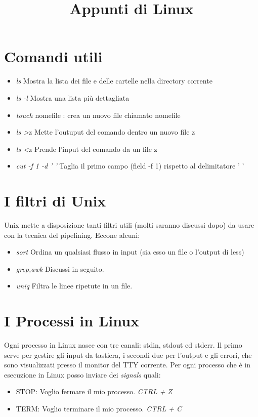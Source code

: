 \documentclass[a4paper,12pt]{article} %
\title{Appunti di Linux} %
\begin{document}
\maketitle %
\tableofcontents %

\section{Comandi utili}
\begin{itemize}
\item  \textit{ls} Mostra la lista dei file e delle cartelle nella directory corrente
\item  \textit{ls -l} Mostra una lista più dettagliata
\item  \textit{touch} nomefile : crea un nuovo file chiamato nomefile
\item  \textit{ls >}z Mette l'outuput del comando dentro un nuovo file z
\item  \textit{ls <}z Prende l'input del comando da un file z
\item  \textit{cut -f 1 -d ' '} Taglia il primo campo (field -f 1) rispetto al delimitatore ' '
\end{itemize}

\section{I filtri di Unix}
Unix mette a disposizione tanti filtri utili (molti saranno discussi dopo) da usare con la tecnica del pipelining. Eccone alcuni:
\begin{itemize}
\item \textit{sort} Ordina un qualsiasi flusso in input (sia esso un file o l'output di less)
\item \textit{grep,awk} Discussi in seguito.
\item \textit{uniq} Filtra le linee ripetute in un file.
\end{itemize}

\section{I Processi in Linux} 
Ogni processo in Linux nasce con tre canali: stdin, stdout ed stderr.
Il primo serve per gestire gli input da tastiera, i secondi due per l'output e gli errori, che sono visualizzati presso il monitor del TTY corrente.
Per ogni processo che è in esecuzione in Linux posso inviare dei \textit{signals} quali:
\begin{itemize}
\item STOP: Voglio fermare il mio processo. \textit{CTRL + Z}
\item TERM: Voglio terminare il mio processo. \textit{CTRL + C}
\end{itemize}
\end{document}

